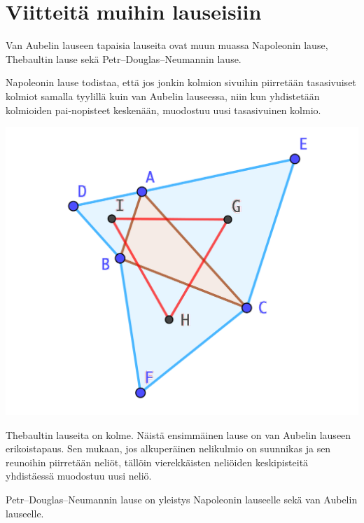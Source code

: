 \documentclass{scrartcl}
\begin{document}
\pagebreak
\section{Viitteitä muihin lauseisiin}

Van Aubelin lauseen tapaisia lauseita ovat muun muassa Napoleonin lause, Thebaultin lause sekä Petr–Douglas–Neumannin lause.

Napoleonin lause todistaa, että jos jonkin kolmion sivuihin piirretään tasasivuiset kolmiot samalla tyylillä kuin van Aubelin lauseessa, niin kun yhdistetään kolmioiden pai-nopisteet keskenään, muodostuu uusi tasasivuinen kolmio.
\begin{center}
    \includegraphics[scale=0.6]{Napoleonin.png}
\end{center}

Thebaultin lauseita on kolme. Näistä ensimmäinen lause on van Aubelin lauseen erikoistapaus. Sen mukaan, jos alkuperäinen nelikulmio on suunnikas ja sen reunoihin piirretään neliöt, tällöin vierekkäisten neliöiden keskipisteitä yhdistäessä muodostuu uusi neliö.

Petr–Douglas–Neumannin lause on yleistys Napoleonin lauseelle sekä van Aubelin lauseelle.


\pagebreak
\end{document}
